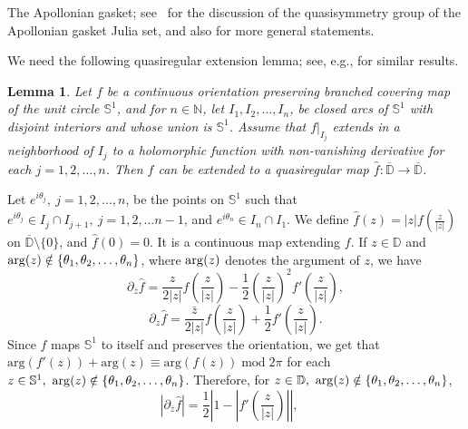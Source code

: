 \documentclass[12pt]{amsart}
\makeatletter
\newtheorem{lem}[thm]{Lemma}
\newtheorem*{ex}{Example}
\newtheorem*{pf}{Proof}
\newcommand{\D}{\mathbb{D}}
\newcommand{\N}{\mathbb{N}}
\newcommand{\co}{\colon}
\renewenvironment{pf}[1][\proofname]{%
  \par
  \pushQED{\qed}%
  \normalfont\topsep6\p@ \@plus6\p@ \trivlist
  \item[\hskip\labelsep\itshape
        \bfseries #1\@addpunct{:}]%
  \ignorespaces
}{%
  \popQED\endtrivlist
}
\renewenvironment{ex}[1][\examplename]{%
  \par
  \pushQED{\qed}%
  \normalfont\topsep6\p@ \@plus6\p@ \trivlist
  \item[\hskip\labelsep\itshape
        \bfseries #1\@addpunct{:}]%
  \ignorespaces
}{%
  \popQED\endtrivlist
}
\renewenvironment{ex}{%
  \normalfont\topsep6\p@ \@plus6\p@ \trivlist
  \item[\hskip\labelsep\bfseries Example:]%
  \ignorespaces
}{%
  \endtrivlist
}
\makeatother
\begin{document}
\begin{ex} The Apollonian gasket; see~\cite{LLMM} for the discussion of the quasisymmetry group of the Apollonian gasket Julia set, and also \cite{LMMN} for more general statements.

 We need the following quasiregular extension lemma; see, e.g., \cite[Lemma~2.2]{LN} for similar results.
\begin{lem}\label{lem:qrext}
	Let $f$ be a continuous orientation preserving  branched covering map of the unit circle $\mathbb{S}^1$, and for $n\in\N$, let $I_1, I_2,\dots, I_n$, be closed arcs of $\mathbb{S}^1$ with disjoint interiors and whose union is $\mathbb{S}^1$.
	Assume that $f|_{I_j}$ extends in a neighborhood of $I_j$ to a holomorphic function with non-vanishing derivative for each $j=1,2,\dots,n$.
%		
 Then  $f$ can be extended to a quasiregular map $\widehat{f}\co\overline{\D}\to \overline{\D}$.
\end{lem}
\begin{pf}
Let $e^{i\theta_j},\ j=1,2,\dots,n$, be the  points on $\mathbb{S}^1$ such that $e^{i\theta_{j}}\in I_{j}\cap I_{j+1},\ j=1,2,\dots n-1$, and $e^{i\theta_n}\in I_n\cap I_1$. We define $\widehat{f}(z)=|z|f(\frac{z}{|z|})$ on $\overline{\D}\setminus\{0\}$, and $\widehat{f}(0)=0$. It is a continuous map extending $f$. If $z\in \D$ and ${\rm arg} (z)\notin\{\theta_1, \theta_2,\dots, \theta_n\}$, where ${\rm arg} (z)$ denotes the argument of $z$, we have
  $$\partial_{\bar{z}}\widehat{f}=\frac{z}{2|z|}f\left(\frac{z}{|z|}\right)-\frac{1}{2}\left(\frac{z}{|z|}\right)^2 f'\left(\frac{z}{|z|}\right),$$
  $$\partial_z\widehat{f}=\frac{\bar{z}}{2|z|}f\left(\frac{z}{|z|}\right)+\frac{1}{2}f'\left(\frac{z}{|z|}\right).$$
  Since $f$ maps $\mathbb{S}^1$ to itself and preserves the orientation, 
we get that $\mathrm{arg}(f'(z))+\mathrm{arg}(z)\equiv \mathrm{arg}(f(z))\; \mathrm{mod}\;2\pi$ for each $z\in \mathbb{S}^1,\ {\rm arg} (z)\notin\{\theta_1, \theta_2,\dots, \theta_n\}$. 
  Therefore, for $z\in\D,\ {\rm arg} (z)\notin\{\theta_1, \theta_2,\dots, \theta_n\}$,  $$\left\lvert \partial_{\bar{z}}\widehat{f}\right\rvert =\frac{1}{2}\left\lvert 1-\left\lvert f'\left(\frac{z}{|z|}\right) \right\rvert\right\rvert,\quad
$$
\end{pf}
\end{ex}
\end{document}
